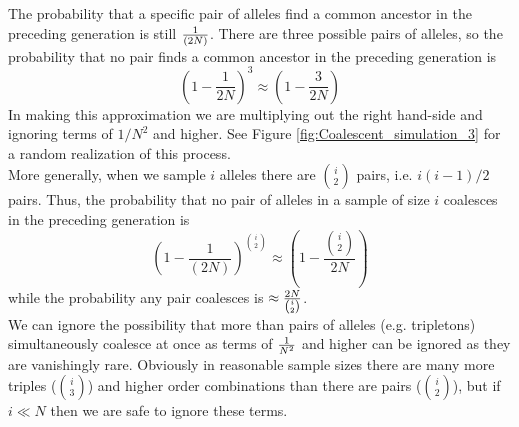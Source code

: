 The probability that a specific pair of alleles find a common ancestor in the
preceding generation is still $\nicefrac{1}{(2N)}$. There are three possible pairs of
alleles, so the probability that no pair finds a common ancestor in the preceding generation is
\begin{equation}
\left(1-\frac{1}{2N} \right)^3 \approx \left( 1- \frac{3}{2N} \right)
\end{equation}
In making this approximation we are multiplying out the right hand-side
and ignoring terms of $1/N^2$ and higher. See
Figure \ref{fig:Coalescent_simulation_3} for a random realization of this process. \\

More generally, when we sample $i$ alleles there are ${i \choose 2}$
pairs,  i.e. $i(i-1)/2$ pairs. Thus, the probability that no pair
of alleles in a sample of size $i$ coalesces in the preceding generation is
\begin{equation}
\left(1-\frac{1}{(2N)} \right)^{{i \choose
 2}} \approx \left( 1- \frac{{i \choose
 2}}{2N}\right)
\end{equation}
while the probability any pair coalesces is $\approx \nicefrac{2N}{{i \choose
 2}}$.\\

We can ignore the possibility that more than pairs of alleles (e.g. tripletons)
simultaneously coalesce at once as terms of $\nicefrac{1}{N^2}$ and higher
can be ignored as they are vanishingly rare. Obviously in reasonable
sample sizes there are many more triples (${i \choose 3}$) and higher order
combinations than there are pairs (${i \choose 2}$), but if $i \ll N$ then we are safe to
ignore these terms.



